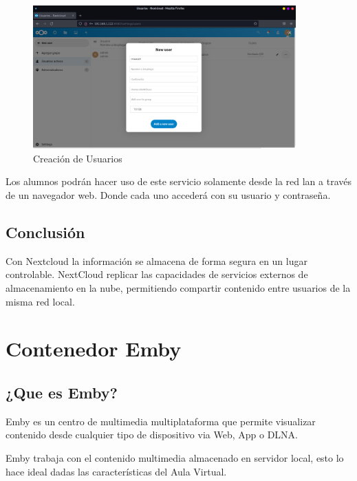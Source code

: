 			\begin{figure}[h]
				
				\centering
				
				\includegraphics[width=0.9\textwidth]{imagenes/docker/nextcloud/creacionUsuarios.png}
				
				\caption{Creación de Usuarios}
				
				\label{fig:usuarios}
			\end{figure}	
		
		Los alumnos podrán hacer uso de este servicio solamente desde la red lan a través de un navegador web. Donde cada uno accederá con su usuario y contraseña.\par
		
		\subsection{Conclusión}
			
			Con Nextcloud la información se almacena de forma segura en un lugar controlable. NextCloud replicar las capacidades de servicios externos de almacenamiento en la nube, permitiendo compartir contenido entre usuarios de la misma red local.

	\section{Contenedor Emby}
	
		\subsection{¿Que es Emby?}
		
			Emby es un centro de multimedia multiplataforma que permite visualizar contenido desde cualquier tipo de dispositivo via Web, App o DLNA. 
		
			Emby trabaja con el contenido multimedia almacenado en servidor local, esto lo hace ideal dadas las características del Aula Virtual.\par
			
